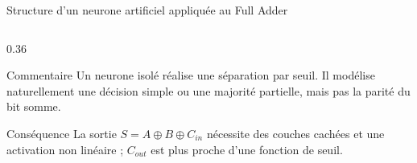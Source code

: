 \documentclass[10pt,aspectratio=169]{beamer}
\begin{document}
\begin{frame}{Structure d'un neurone artificiel appliquée au Full Adder}
\begin{columns}[T]
\begin{column}{0.36\textwidth}
\begin{exampleblock}{Commentaire}
\footnotesize
Un neurone isolé réalise une séparation par seuil. Il modélise naturellement une décision simple ou une majorité partielle, mais pas la parité du bit somme.
\end{exampleblock}
\vspace{0.10cm}
\begin{alertblock}{Conséquence}
\footnotesize
La sortie \(S=A\oplus B\oplus C_{in}\) nécessite des couches cachées et une activation non linéaire ; \(C_{out}\) est plus proche d'une fonction de seuil.
\end{alertblock}
\vspace{0.05cm}
\begin{center}
\end{center}
\end{column}
\end{columns}
\end{frame}
\end{document}
